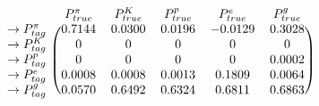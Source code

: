 \documentclass{standalone}
\begin{document}
$\displaystyle
\begin{blockarray}{cccccc}
    & P^\pi_{true} & P^K_{true} & P^p_{true} & P^e_{true} & P^g_{true} \\
\begin{block}{c(ccccc)}
    \rightarrow P^\pi_{tag}  & 0.7144  & 0.0300  & 0.0196  & -0.0129  & 0.3028 \\
    \rightarrow P^K_{tag}    & 0       & 0       & 0       &  0       & 0      \\
    \rightarrow P^p_{tag}    & 0       & 0       & 0       &  0       & 0.0002 \\
    \rightarrow P^e_{tag}    & 0.0008  & 0.0008  & 0.0013  &  0.1809  & 0.0064 \\
    \rightarrow P^g_{tag}    & 0.0570  & 0.6492  & 0.6324  &  0.6811  & 0.6863 \\
\end{block}
\end{blockarray}
$
\end{document}
